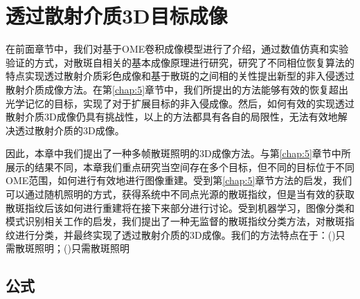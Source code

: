 
\chapter{透过散射介质3D目标成像}

在前面章节中，我们对基于OME卷积成像模型进行了介绍，通过数值仿真和实验验证的方式，对散斑自相关的基本成像原理进行研究，研究了不同相位恢复算法的特点实现透过散射介质彩色成像和基于散斑的之间相的关性提出新型的非入侵透过散射介质成像方法。在第\ref{chap:5}章节中，我们所提出的方法能够有效的恢复超出光学记忆的目标，实现了对于扩展目标的非入侵成像。然后，如何有效的实现透过散射介质3D成像仍具有挑战性，以上的方法都具有各自的局限性，无法有效地解决透过散射介质的3D成像。

因此，本章中我们提出了一种多帧散斑照明的3D成像方法。与第\ref{chap:5}章节中所展示的结果不同，本章我们重点研究当空间存在多个目标，但不同的目标位于不同OME范围，如何进行有效地进行图像重建。受到第\ref{chap:5}章节方法的启发，我们可以通过随机照明的方式，获得系统中不同点光源的散斑指纹，但是当有效的获取散斑指纹后该如何进行重建将在接下来部分进行讨论。受到机器学习，图像分类和模式识别相关工作的启发，我们提出了一种无监督的散斑指纹分类方法，对散斑指纹进行分类，并最终实现了透过散射介质的3D成像。我们的方法特点在于：()只需散斑照明；()只需散斑照明

\section{公式}
